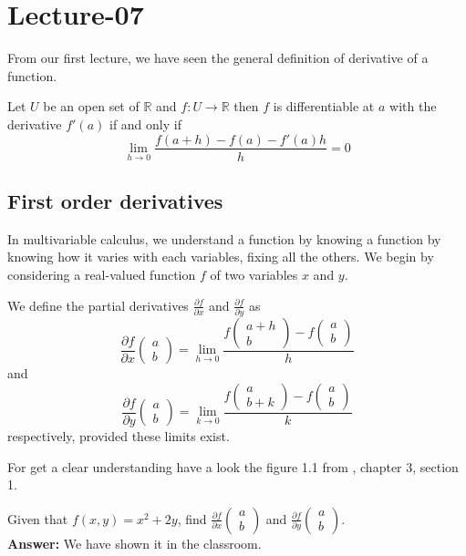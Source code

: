\newpage
\section{Lecture-07}
From our first lecture, we have seen the general definition of 
derivative of a function. 
\begin{definition}
    Let $U$ be an open set of $\mathbb R$ and $f: U \to \mathbb R$ then 
    $f$ is differentiable at $a$ with the derivative $f'(a)$ if and only if
    $$
    \lim_{h \to 0} \frac{f(a+h) - f(a)-f'(a)h}{h}=0
    $$
\end{definition}
\subsection{First order derivatives}
In multivariable calculus, we understand a function by knowing
a function by knowing how it varies with each variables,
fixing all the others. We begin by considering a real-valued
function $f$ of two variables $x$ and $y$. 
\begin{definition}
    We define the partial derivatives $\frac{\partial f}{\partial x}$ and $\frac{\partial f}{\partial y}$ as
    $$
    \frac{\partial f}{\partial x}\begin{pmatrix} a \\ b \end{pmatrix} = \lim_{h \to 0} \frac{f\begin{pmatrix} a+h \\ b \end{pmatrix} - f\begin{pmatrix} a \\ b \end{pmatrix}}{h}
    $$
    and
    $$
    \frac{\partial f}{\partial y}\begin{pmatrix} a \\ b \end{pmatrix} = \lim_{k \to 0} \frac{f\begin{pmatrix} a \\ b+k \end{pmatrix} - f\begin{pmatrix} a \\ b \end{pmatrix}}{k}
    $$
    respectively, provided these limits exist.
\end{definition}
For get a clear understanding have a look the figure 1.1 from \cite{shifrin}, chapter 3, section 1.
\begin{example}
    Given that $f(x,y) = x^2+2y$, find $\frac{\partial f}{\partial x}\begin{pmatrix} a \\ b \end{pmatrix}$ and $\frac{\partial f}{\partial y}\begin{pmatrix} a \\ b \end{pmatrix}$.\\
    \textbf{Answer:} We have shown it in the classroom.
\end{example}
